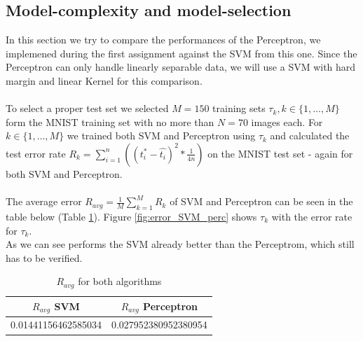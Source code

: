 \subsection{Model-complexity and model-selection}


In this section we try to compare the performances of the Perceptron, we implemened during the first assignment against the SVM from this one.
Since the Perceptron can only handle linearly separable data, we will use a SVM with hard margin and linear Kernel for this comparison.
\\
\\
To select a proper test set we selected $M = 150$ training sets $\tau _{k},k \in \{1,\ldots,M\}$ form the MNIST training set with no more than $N = 70$ images each.
For $k \in \{1,\ldots,M\}$ we trained both SVM and Perceptron using $\tau_k$ and calculated the test error rate $R_k = \sum_{i=1}^{n}( (t_{i}^{\ast} - \hat{t_{i}} )^2 * \frac{1}{4n} ) $ on the {MNIST} test set - again for both SVM and Perceptron.
\\
\\
The average error $R_{avg} = \frac{1}{M}\sum_{k=1}^M R_k$ of SVM and Perceptron can be seen in the table below (Table \ref{tab:avg_error}).
Figure \ref{fig:error_SVM_perc} shows $\tau_k$ with the error rate for $\tau_k$.\\

As we can see performs the SVM already better than the Perceptrom, which still has to be verified.

\begin{table}[!h]
 \begin{center}
\begin{tabular}{|c|c|}
 \hline
 \textbf{$R_{avg}$ SVM} & \textbf{ $R_{avg}$ Perceptron} \\
 \hline
 0.01441156462585034       &     0.027952380952380954      \\
 \hline
\end{tabular}
\caption{\label{tab:avg_error} $R_{avg}$ for both algorithms }
\end{center}
\end{table}

